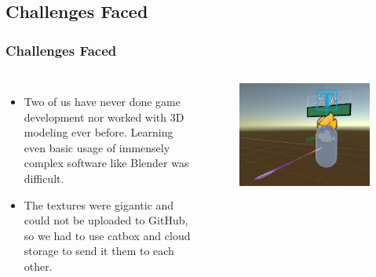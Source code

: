 \documentclass{beamer}
\begin{document}
\subsection{Challenges Faced}
\begin{frame}
\frametitle{Challenges Faced}
    \begin{columns}
    \begin{itemize}
        \item Two of us have never done game development nor worked with 3D modeling ever before. Learning even basic usage of immensely complex software like Blender was difficult.
        \item The textures were gigantic and could not be uploaded to GitHub, so we had to use catbox and cloud storage to send it them to each other.
    \end{itemize}
        \begin{figure}
            \includegraphics[width=\textwidth,keepaspectratio]{glitched_player}
        \end{figure}
    \end{columns}
\end{frame}
\end{document}
